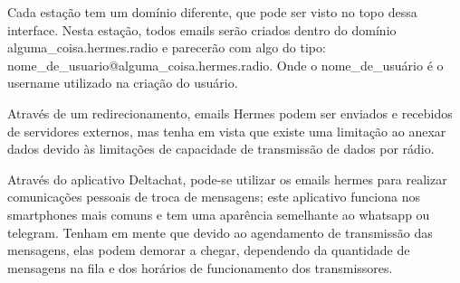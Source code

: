 \documentclass[11pt,a4paper]{article}
\begin{document}


Cada estação tem um domínio diferente, que pode ser visto no topo dessa interface. Nesta estação, todos emails serão criados dentro do domínio  alguma\_coisa.hermes.radio e parecerão com algo do tipo: nome\_de\_usuario@alguma\_coisa.hermes.radio. Onde o nome\_de\_usuário é o username utilizado na criação do usuário.




Através de um redirecionamento, emails Hermes podem ser enviados e recebidos de servidores externos, mas tenha em vista que existe uma limitação ao anexar dados devido às limitações de capacidade de transmissão de dados por rádio.





Através do aplicativo Deltachat, pode-se utilizar os emails hermes para realizar comunicações pessoais de troca de mensagens; este aplicativo funciona nos smartphones mais comuns e tem uma aparência semelhante ao whatsapp ou telegram. Tenham em mente que devido ao agendamento de transmissão das mensagens, elas podem demorar a chegar, dependendo da quantidade de mensagens na fila e dos horários de funcionamento dos transmissores.
\end{document}

